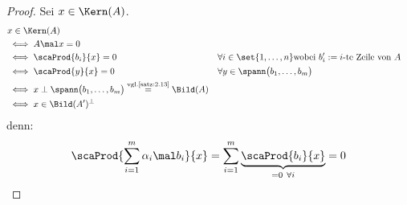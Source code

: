 \begin{proof}
	Sei $x\in\Kern(A)$.
	\begin{align*}
		&x\in\Kern(A)\\
		&\iff A\mal x=0\\
		&\iff\scaProd{b_i}{x}=0 &&\forall i\in\set{1,\ldots,n}\text{wobei $b_i':=i$-te Zeile von $A$}\\
		&\iff\scaProd{y}{x}=0 &&\forall y\in\spann\big(b_1,\ldots,b_m\big)\\
		&\iff x\perp\spann\big(b_1,\ldots,b_m\big)
		\overset{\text{vgl.\ref{satz:2.13}}}{=}		
		\Bild(A)\\
		&\iff x\in\Bild(A')^\perp
	\end{align*}
	denn:
	\begin{align*}
		\scaProd{\sum\limits_{i=1}^m \alpha_i\mal b_i}{x}=\sum\limits_{i=1}^m\underbrace{\scaProd{b_i}{x}}_{=0~\forall i}=0
	\end{align*}
\end{proof}

